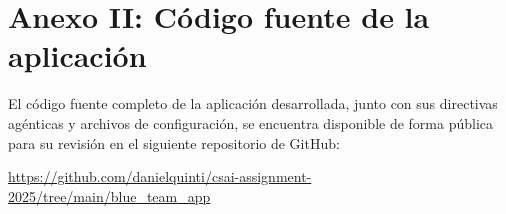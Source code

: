 \chapter[Anexo II: Código Fuente]{Anexo II: Código fuente de la aplicación}
\label{chap:anexo_codigo}

El código fuente completo de la aplicación desarrollada, junto con sus directivas agénticas y archivos de configuración, se encuentra disponible de forma pública para su revisión en el siguiente repositorio de GitHub:

\begin{center}
    \url{https://github.com/danielquinti/csai-assignment-2025/tree/main/blue_team_app}
\end{center}
